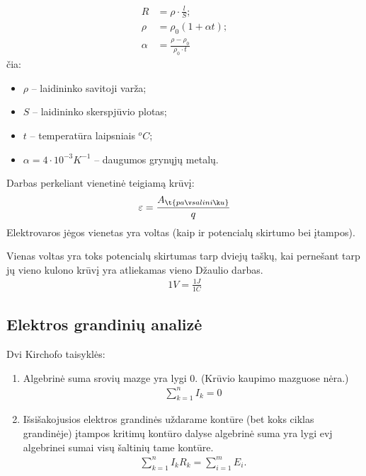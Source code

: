 \begin{defn}[Varža]
  \begin{align*}
    R &= \rho \cdot \frac{l}{S}; \\
    \rho &= \rho_{0} (1 + \alpha t); \\
    \alpha &= \frac{\rho - \rho_{0}}{\rho_{0} \cdot t}
  \end{align*}
  čia:
  \begin{itemize}
    \item $\rho$ – laidininko savitoji varža;
    \item $S$ – laidininko skerspjūvio plotas;
    \item $t$ – temperatūra laipsniais ${}^{o}C$;
    \item $\alpha = 4 \cdot 10^{-3} K^{-1}$ – daugumos grynųjų metalų.
  \end{itemize}
\end{defn}


\begin{defn}
  Darbas perkeliant vienetinė teigiamą krūvį:
  \begin{equation*}
    \varepsilon = \frac{A_{\t{pašalinių}}}{q}
  \end{equation*}
  Elektrovaros jėgos vienetas yra voltas (kaip ir potencialų skirtumo
  bei įtampos).
\end{defn}

\begin{defn}
  Vienas voltas yra toks potencialų skirtumas tarp dviejų taškų, kai
  pernešant tarp jų vieno kulono krūvį yra atliekamas vieno Džaulio
  darbas.
  \begin{align*}
    1 V = \frac{1J}{1C}
  \end{align*}
\end{defn}

\subsection{Elektros grandinių analizė}

Dvi Kirchofo taisyklės:
\begin{enumerate}
  \item Algebrinė suma srovių mazge yra lygi 0. (Krūvio kaupimo mazguose
    nėra.)
    \begin{align*}
      \sum ^{n} _{k=1} I_{k} = 0
    \end{align*}
  \item Išsišakojusios elektros grandinės uždarame kontūre (bet koks ciklas 
    grandinėje) įtampos kritimų kontūro dalyse algebrinė suma yra
    lygi evj algebrinei sumai visų šaltinių tame kontūre.
    \begin{align*}
      \sum _{k=1} ^{n} I_{k} R_{k} = \sum _{i=1} ^{m} E_{i}.
    \end{align*}
\end{enumerate}

